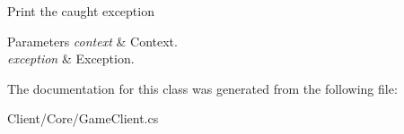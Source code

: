 Print the caught exception 


\begin{DoxyParams}{Parameters}
{\em context} & Context.\\
\hline
{\em exception} & Exception.\\
\hline
\end{DoxyParams}


The documentation for this class was generated from the following file\+:\begin{DoxyCompactItemize}
\item 
Client/\+Core/Game\+Client.\+cs\end{DoxyCompactItemize}
